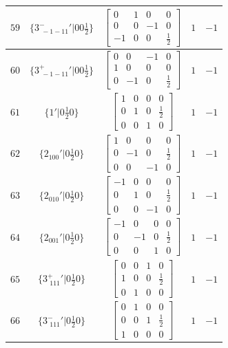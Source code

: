 \documentclass[fleqn,8pt]{jsarticle}
\begin{document}
\begin{longtable}{ccccc}
$ 59 $ & $ \{3^{-}_{\,\,-1-11}{}'|0 0 \frac{1}{2}\} $ & $ \begin{bmatrix} 0 & 1 & 0 & 0 \\ 0 & 0 & -1 & 0 \\ -1 & 0 & 0 & \frac{1}{2} \end{bmatrix} $ & $ 1 $ & $ -1 $ \\ \hline
$ 60 $ & $ \{3^{+}_{\,\,-1-11}{}'|0 0 \frac{1}{2}\} $ & $ \begin{bmatrix} 0 & 0 & -1 & 0 \\ 1 & 0 & 0 & 0 \\ 0 & -1 & 0 & \frac{1}{2} \end{bmatrix} $ & $ 1 $ & $ -1 $ \\ \hline
$ 61 $ & $ \{1{}'|0 \frac{1}{2} 0\} $ & $ \begin{bmatrix} 1 & 0 & 0 & 0 \\ 0 & 1 & 0 & \frac{1}{2} \\ 0 & 0 & 1 & 0 \end{bmatrix} $ & $ 1 $ & $ -1 $ \\ \hline
$ 62 $ & $ \{2{}_{100}{}'|0 \frac{1}{2} 0\} $ & $ \begin{bmatrix} 1 & 0 & 0 & 0 \\ 0 & -1 & 0 & \frac{1}{2} \\ 0 & 0 & -1 & 0 \end{bmatrix} $ & $ 1 $ & $ -1 $ \\ \hline
$ 63 $ & $ \{2{}_{010}{}'|0 \frac{1}{2} 0\} $ & $ \begin{bmatrix} -1 & 0 & 0 & 0 \\ 0 & 1 & 0 & \frac{1}{2} \\ 0 & 0 & -1 & 0 \end{bmatrix} $ & $ 1 $ & $ -1 $ \\ \hline
$ 64 $ & $ \{2{}_{001}{}'|0 \frac{1}{2} 0\} $ & $ \begin{bmatrix} -1 & 0 & 0 & 0 \\ 0 & -1 & 0 & \frac{1}{2} \\ 0 & 0 & 1 & 0 \end{bmatrix} $ & $ 1 $ & $ -1 $ \\ \hline
$ 65 $ & $ \{3^{+}_{\,\,111}{}'|0 \frac{1}{2} 0\} $ & $ \begin{bmatrix} 0 & 0 & 1 & 0 \\ 1 & 0 & 0 & \frac{1}{2} \\ 0 & 1 & 0 & 0 \end{bmatrix} $ & $ 1 $ & $ -1 $ \\ \hline
$ 66 $ & $ \{3^{-}_{\,\,111}{}'|0 \frac{1}{2} 0\} $ & $ \begin{bmatrix} 0 & 1 & 0 & 0 \\ 0 & 0 & 1 & \frac{1}{2} \\ 1 & 0 & 0 & 0 \end{bmatrix} $ & $ 1 $ & $ -1 $ \\ \hline

\end{longtable}
\end{document}
